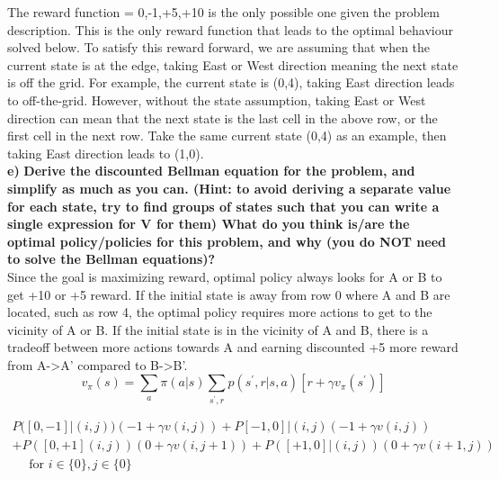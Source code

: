 \documentclass[11pt]{article}
\begin{document}
\noindent
The reward function = {0,-1,+5,+10} is the only possible one given the problem
description. This is the only reward function that leads to the optimal
behaviour solved below. To satisfy this reward forward, we are assuming that
when the current state is at the edge, taking East or West direction meaning the
next state is off the grid. For example, the current state is (0,4), taking East
direction leads to off-the-grid. However, without the state assumption, taking
East or West direction can mean that the next state is the last cell in the
above row, or the first cell in the next row. Take the same current state (0,4)
as an example, then taking East direction leads to (1,0). 
\\

\noindent
\textbf{e)}
\noindent
\textbf{Derive the discounted Bellman equation for the problem, and simplify
as much as you can. (Hint: to avoid deriving a separate value for each state,
try to find groups of states such that you can write a single expression for V for
them) What do you think is/are the optimal policy/policies for this problem,
and why (you do NOT need to solve the Bellman equations)?}
\\

\noindent
Since the goal is maximizing reward, optimal policy always looks for A or B to
get +10 or +5 reward. If the initial state is away from row 0 where A and B are
located, such as row 4, the optimal policy requires more actions to get to the
vicinity of A or B. If the initial state is in the vicinity of A and B, there is
a tradeoff between more actions towards A and earning discounted +5 more reward
from A->A’ compared to B->B’.
\\


\begin{equation}
v_{\pi}(s)=\sum_{a} \pi(a | s) \sum_{s^{\prime}, r} p\left(s^{\prime}, r | s, a\right)\left[r+\gamma v_{\pi}\left(s^{\prime}\right)\right]
\end{equation}



\begin{equation}
\begin{array}{c}
{P([0,-1] |(i, j))(-1+\gamma v(i, j))+P[-1,0] |(i, j)(-1+\gamma v(i, j))} \\
{+P([0,+1](i, j))(0+\gamma v(i, j+1))+P([+1, 0] |(i, j))(0+\gamma v(i+1, j))} \\
{\quad \text { for } i \in\{0\}, j \in\{0\}}
\end{array}
\end{equation}
\end{document}
